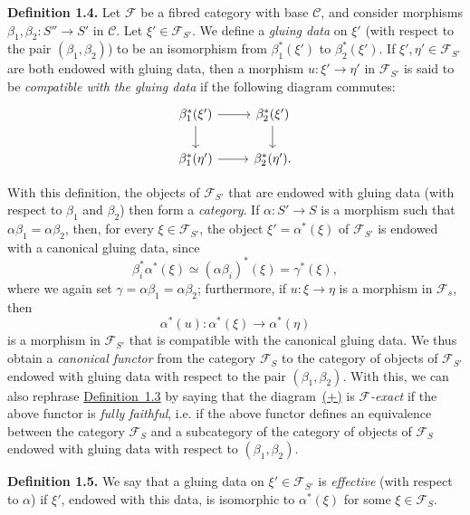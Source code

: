 \documentclass{article}
\newenvironment{rmenv}[1]
  {\phantomsection\par\medskip\noindent\textbf{#1.}\rmfamily}
  {\medskip}
\renewcommand{\cal}[1]{{\mathcal{#1}}}
\newcommand{\oldpage}[1]{\marginpar{\footnotesize$\Big\vert$ \textit{p.~#1}}}
\begin{document}
\begin{rmenv}{Definition 1.4}
  Let $\cal{F}$ be a fibred category with base $\cal{C}$, and consider morphisms $\beta_1,\beta_2\colon S''\to S'$ in $\cal{C}$.
  Let $\xi'\in\cal{F}_{S'}$.
  We define a \emph{gluing data} on $\xi'$ (with respect to the pair $(\beta_1,\beta_2)$) to be an isomorphism from $\beta_1^*(\xi')$ to $\beta_2^*(\xi')$.
  If $\xi',\eta'\in\cal{F}_{S'}$ are both endowed with gluing data, then a morphism $u\colon\xi'\to\eta'$ in $\cal{F}_{S'}$ is said to be \emph{compatible with the gluing data} if the following diagram commutes:
  \[
    \begin{tikzcd}
      \beta_1^*(\xi') \rar \dar
      &\beta_2^*(\xi') \dar
    \\\beta_1^*(\eta') \rar
      &\beta_2^*(\eta').
    \end{tikzcd}
  \]
\end{rmenv}

With this definition, the objects of $\cal{F}_{S'}$ that are endowed with gluing data (with respect to $\beta_1$ and $\beta_2$) then form a \emph{category}.
If $\alpha\colon S'\to S$ is a morphism such that $\alpha\beta_1=\alpha\beta_2$, then, for every $\xi\in\cal{F}_{S'}$, the object $\xi'=\alpha^*(\xi)$
\oldpage{190-04}
of $\cal{F}_{S'}$ is endowed with a canonical gluing data, since
\[
  \beta_i^*\alpha^*(\xi)
  \simeq (\alpha\beta_i)^*(\xi)
  = \gamma^*(\xi),
\]
where we again set $\gamma=\alpha\beta_1=\alpha\beta_2$;
furthermore, if $u\colon\xi\to\eta$ is a morphism in $\cal{F}_s$, then
\[
  \alpha^*(u)\colon \alpha^*(\xi) \to \alpha^*(\eta)
\]
is a morphism in $\cal{F}_{S'}$ that is compatible with the canonical gluing data.
We thus obtain a \emph{canonical functor} from the category $\cal{F}_S$ to the category of objects of $\cal{F}_{S'}$ endowed with gluing data with respect to the pair $(\beta_1,\beta_2)$.
With this, we can also rephrase \hyperref[definition:A.1.3]{Definition~1.3} by saying that the diagram~\hyperref[equation-definition:A.1.3]{(+)} is \emph{$\cal{F}$-exact} if the above functor is \emph{fully faithful}, i.e. if the above functor defines an equivalence between the category $\cal{F}_S$ and a subcategory of the category of objects of $\cal{F}_S$ endowed with gluing data with respect to $(\beta_1,\beta_2)$.

\begin{rmenv}{Definition 1.5}
\label{definition:A.1.5}
  We say that a gluing data on $\xi'\in\cal{F}_{S'}$ is \emph{effective} (with respect to $\alpha$) if $\xi'$, endowed with this data, is isomorphic to $\alpha^*(\xi)$ for some $\xi\in\cal{F}_S$.
\end{rmenv}
\end{document}
